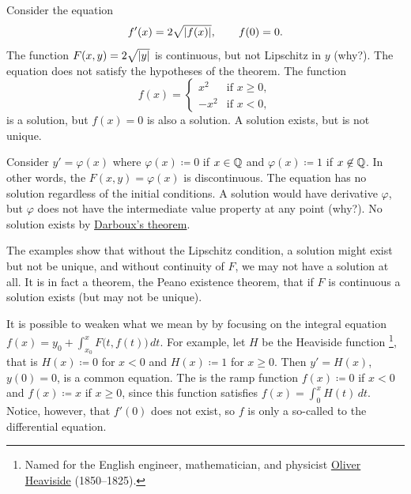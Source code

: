 \begin{example}
Consider the equation
\begin{equation*}
f'(x) = 2 \sqrt{\left\lvert {f(x)} \right\rvert}, \qquad f(0) = 0 .
\end{equation*}
The function $F(x,y) = 2 \sqrt{\left\lvert {y} \right\rvert}$ is continuous,
but not Lipschitz in $y$ (why?). 
The equation does not satisfy the hypotheses of the theorem.
The function
\begin{equation*}
f(x) =
\begin{cases}
x^2 & \text{if } x \geq 0,\\
-x^2 & \text{if } x < 0,
\end{cases}
\end{equation*}
is a solution, but $f(x) = 0$ is also a solution.
A solution exists, but is not unique.
\end{example}

\begin{example}
Consider $y' = \varphi(x)$ where $\varphi(x) \coloneqq 0$ if $x \in {\mathbb{Q}}$ and
$\varphi(x)\coloneqq 1$ if $x
\not\in {\mathbb{Q}}$.  In other words, the $F(x,y) = \varphi(x)$ is discontinuous.
The equation has no solution regardless of the initial
conditions.
A solution would have
derivative $\varphi$, but $\varphi$ does not have the intermediate value property
at any point (why?).  No solution exists by
\hyperref[thm:darboux]{Darboux's theorem}.
\end{example}

The examples show that without the Lipschitz condition, a solution might
exist but not be unique, and without continuity of $F$, we may not
have a solution at all.
It is in fact a theorem, the Peano existence theorem, that if $F$ is
continuous a solution exists (but may not be unique).

\begin{remark}
It is possible to weaken what we mean by 
by focusing on the integral equation
$f(x) = y_0 + \int_{x_0}^x F\bigl(t,f(t)\bigr) \, dt$.  For example,
let $H$ be the
Heaviside function%
\footnote{Named
for the English engineer, mathematician, and physicist
\href{https://en.wikipedia.org/wiki/Oliver_Heaviside}{Oliver Heaviside}
(1850--1825).},
that is $H(x) \coloneqq 0$ for $x < 0$ and $H(x) \coloneqq 1$ for $x \geq 0$.
Then
$y' = H(x)$, $y(0) = 0$,
is a common equation.
The 
is the ramp function $f(x) \coloneqq 0$ if $x < 0$ and $f(x) \coloneqq x$ if $x \geq 0$,
since this function satisfies
$f(x) = \int_0^x H(t)\, dt$.  Notice, however, that $f'(0)$ does not exist,
so $f$ is only a so-called \emph{} to the
differential equation.
\end{remark}


